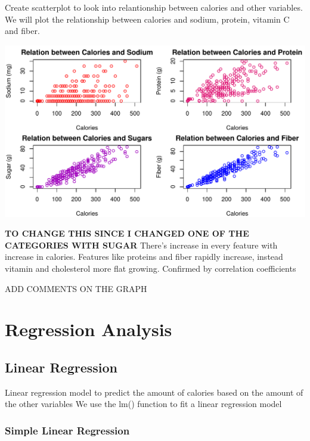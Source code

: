 \documentclass[
]{article}
\begin{document}
Create scatterplot to look into relantionship between calories and other
variables. We will plot the relationship between calories and sodium,
protein, vitamin C and fiber.

\begin{center}\includegraphics{Statistical_Learning_Final_Report_files/figure-latex/scatterplot-1} \end{center}

\textbf{TO CHANGE THIS SINCE I CHANGED ONE OF THE CATEGORIES WITH SUGAR}
There's increase in every feature with increase in calories. Features
like proteins and fiber rapidly increase, instead vitamin and
cholesterol more flat growing. Confirmed by correlation coefficients

ADD COMMENTS ON THE GRAPH

\hypertarget{regression-analysis}{%
\section{Regression Analysis}\label{regression-analysis}}

\hypertarget{linear-regression}{%
\subsection{Linear Regression}\label{linear-regression}}

Linear regression model to predict the amount of calories based on the
amount of the other variables We use the lm() function to fit a linear
regression model

\hypertarget{simple-linear-regression}{%
\subsubsection{Simple Linear
Regression}\label{simple-linear-regression}}
\end{document}
